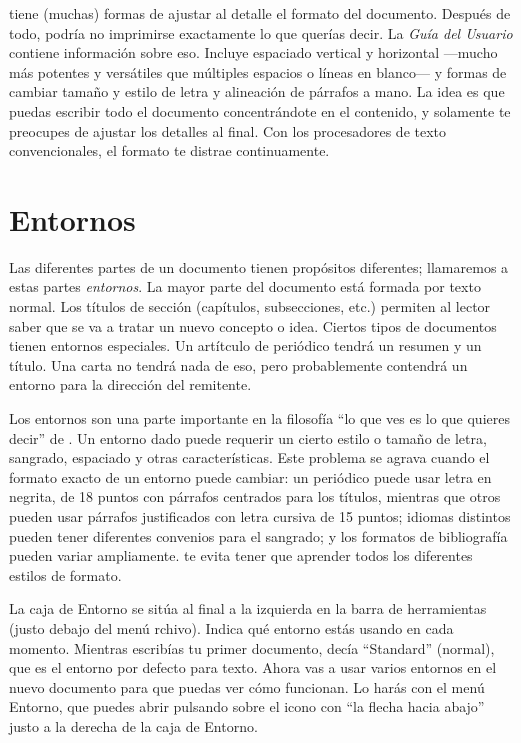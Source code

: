 \LyX{} tiene (muchas) formas de ajustar al detalle el formato del
documento. Después de todo, podría no imprimirse exactamente lo que
querías decir. La \emph{Guía del Usuario} contiene información sobre
eso. Incluye espaciado vertical y horizontal ---mucho más potentes
y versátiles que múltiples espacios o líneas en blanco--- y formas
de cambiar tamaño y estilo de letra y alineación de párrafos a mano.
La idea es que puedas escribir todo el documento concentrándote en
el contenido, y solamente te preocupes de ajustar los detalles al
final. Con los procesadores de texto convencionales, el formato te
distrae continuamente.


\section{Entornos}

Las diferentes partes de un documento tienen propósitos diferentes;
llamaremos a estas partes \emph{entornos}. La mayor parte del documento
está formada por texto normal. Los títulos de sección (capítulos,
subsecciones, etc.) permiten al lector saber que se va a tratar un
nuevo concepto o idea. Ciertos tipos de documentos tienen entornos
especiales. Un artítculo de periódico tendrá un resumen y un título.
Una carta no tendrá nada de eso, pero probablemente contendrá un entorno
para la dirección del remitente.

Los entornos son una parte importante en la filosofía {}``lo que
ves es lo que quieres decir'' de \LyX{}. Un entorno dado puede requerir
un cierto estilo o tamaño de letra, sangrado, espaciado y otras características.
Este problema se agrava cuando el formato exacto de un entorno puede
cambiar: un periódico puede usar letra en negrita, de 18 puntos con
párrafos centrados para los títulos, mientras que otros pueden usar
párrafos justificados con letra cursiva de 15 puntos; idiomas distintos
pueden tener diferentes convenios para el sangrado; y los formatos
de bibliografía pueden variar ampliamente. \LyX{} te evita tener que
aprender todos los diferentes estilos de formato.

La caja de \textsf{Entorno} se sitúa al final a la izquierda en la
barra de herramientas (justo debajo del menú \textsf{}\textsf{rchivo}).
Indica qué entorno estás usando en cada momento. Mientras escribías
tu primer documento, decía {}``Standard'' (normal), que es el entorno
por defecto para texto. Ahora vas a usar varios entornos en el nuevo
documento para que puedas ver cómo funcionan. Lo harás con el menú
\textsf{Entorno,} que puedes abrir pulsando sobre el icono con {}``la
flecha hacia abajo'' justo a la derecha de la caja de \textsf{Entorno.}


